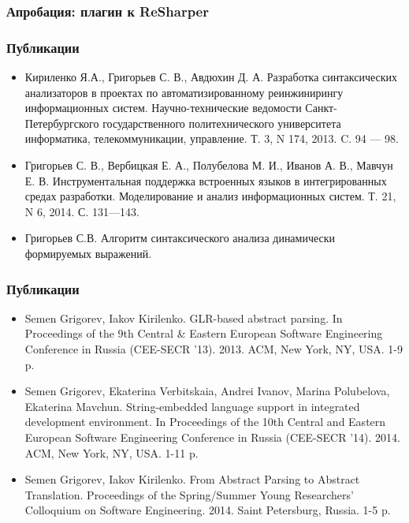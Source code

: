 \documentclass{beamer}
\begin{document}
\begin{frame}[t]
    \transwipe[direction=90]
    \frametitle{Апробация: плагин к ReSharper}
\end{frame}

\begin{frame}
    \transwipe[direction=90]
    \frametitle{Публикации}
  \begin{itemize}
      \item Кириленко Я.А., Григорьев С. В., Авдюхин Д. А. Разработка синтаксических анализаторов в проектах по автоматизированному реинжинирингу информационных систем.  Научно-технические ведомости Санкт-Петербургского государственного политехнического университета информатика, телекоммуникации, управление. Т. 3, N 174, 2013. C. 94 --- 98.
      \item Григорьев С. В., Вербицкая Е. А., Полубелова М. И., Иванов А. В., Мавчун Е. В. Инструментальная поддержка встроенных языков в интегрированных средах разработки. Моделирование и анализ информационных систем. Т. 21, N 6, 2014. С. 131---143.
      \item Григорьев С.В. Алгоритм синтаксического анализа динамически формируемых выражений.
  \end{itemize} 
\end{frame}

\begin{frame}
    \transwipe[direction=90]
    \frametitle{Публикации}
  \begin{itemize}
          \item Semen Grigorev, Iakov Kirilenko. GLR-based abstract parsing. In Proceedings of the 9th Central \& Eastern European Software Engineering Conference in Russia (CEE-SECR ’13). 2013. ACM, New York, NY, USA. 1-9 p.
          \item Semen Grigorev, Ekaterina Verbitskaia, Andrei Ivanov, Marina Polubelova, Ekaterina Mavchun. String-embedded language support in integrated development environment. In Proceedings of the 10th Central and Eastern European Software Engineering Conference in Russia (CEE-SECR '14). 2014. ACM, New York, NY, USA. 1-11 p.
          \item Semen Grigorev, Iakov Kirilenko. From Abstract Parsing to Abstract Translation. Proceedings of the Spring/Summer Young Researchers' Colloquium on Software Engineering. 2014. Saint Petersburg, Russia. 1-5 p.
  \end{itemize} 
\end{frame}
\end{document}
